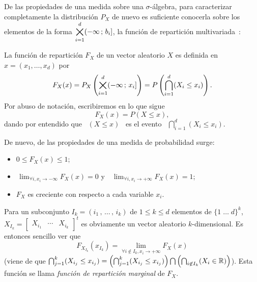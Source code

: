 De las propiedades de una medida sobre una $\sigma$-\'algebra, para caracterizar
completamente la distribuci\'on $P_X$ de nuevo es suficiente conocerla sobre los
elementos de  la forma $\displaystyle  \operatorname*{\bigtimes}_{i=1}^d (-\infty \, ; \, b_i]$,
\ie  la funci\'on  de repartici\'on  multivariada~\cite{AthLah06,  Coh13, Bre88,
  HogMck13}:
%
\begin{definicion}
\label{Def:MP:FuncionReparticionMultivariada}
%
  La funci\'on de repartici\'on $F_X$ de  un vector aleatorio $X$ es definida en
  $x = (x_1 , \ldots , x_d)$ por
  \[
  F_X(x) =  P_X\left( \operatorname*{\bigtimes}_{i=1}^d (-\infty \, ; \, x_i]  \right) = P\left(
    \bigcap_{i=1}^d (X_i \le x_i) \right).
  \]
  Por abuso de notaci\'on, escribiremos en lo que sigue
  \[
  F_X(x) = P(X \le x),
  \]
  dando  por entendido  que  \  $(X \le  x)$  \ es  el  evento \  $\displaystyle
  \bigcap_{i=1}^d (X_i \le x_i)$.
\end{definicion}
%
De nuevo, de las propiedades de una medida de probabilidad surge:
%
\begin{itemize}
\item $0 \le F_X(x) \le 1$;
%
\item  $\displaystyle \,  \lim_{\forall i,  x_i  \to -\infty}  F_X(x) =  0$ y  \
  $\displaystyle \, \lim_{\forall i, x_i \to +\infty} F_X(x) = 1$;
%
\item $F_X$ es creciente con respecto a cada variable $x_i$.
\end{itemize}
%
Para un subconjunto $I_k = (i_1 \, , \,  \ldots \, , \, i_k)$ de $1 \le k \le d$
elementos de  $\{ 1  \; \ldots \;  d \}^k$,  $X_{I_k} = \begin{bmatrix}  X_{i_1} &
  \cdots   &   X_{i_k}\end{bmatrix}^t$  es   obviamente   un  vector   aleatorio
$k$-dimensional. Es entonces sencillo ver que
%
\[
F_{X_{I_k}}(x_{I_k}) = \lim_{\forall i \not\in I_k, x_i \to +\infty} F_X(x)
\label{Pagina:MP:MarginalesF}
\]
%
\Big(viene de  que $\bigcap_{j=1}^k (X_{i_j}  \le x_{i_j}) =  \left( \bigcap_{j=1}^k
  (X_{i_j} \le x_{i_j}) \right) \bigcap  \left( \bigcap_{i \not\in I_k} (X_i \in
  \mathbb{R})  \right)$\Big). Esta  funci\'on se llama {\it  funci\'on  de repartici\'on
  marginal} de $F_X$.

